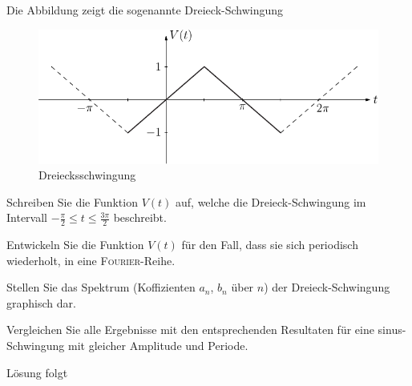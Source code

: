 \documentclass{atistandalonetask}
\begin{document}
  \begin{atiTask}[
    title = Dreiecksschwingung
  ]
	Die Abbildung zeigt die sogenannte Dreieck-Schwingung
	\begin{figure}[H]
	\centering
	\includegraphics[width=0.7\linewidth]{picture-fourier_iii}
	\caption{Dreiecksschwingung}
	\end{figure}

	\begin{atiSubtasks}
		\item
		Schreiben Sie die Funktion $V(t)$ auf, welche die Dreieck-Schwingung im Intervall $-\frac{\pi}{2}\leq t\leq \frac{3\pi}{2}$ beschreibt. 
		\item Entwickeln Sie die Funktion $V(t)$ für den Fall, dass sie sich periodisch wiederholt, in eine \textsc{Fourier}-Reihe. 
		\item Stellen Sie das Spektrum (Koffizienten $a_n$, $b_n$ über $n$) der Dreieck-Schwingung graphisch dar.
		\item Vergleichen Sie alle Ergebnisse mit den entsprechenden Resultaten für eine sinus-Schwingung mit gleicher Amplitude und Periode. 
	\end{atiSubtasks} 
  \end{atiTask}
  \begin{atiSolution}
   Lösung folgt
  \end{atiSolution}
\end{document}
